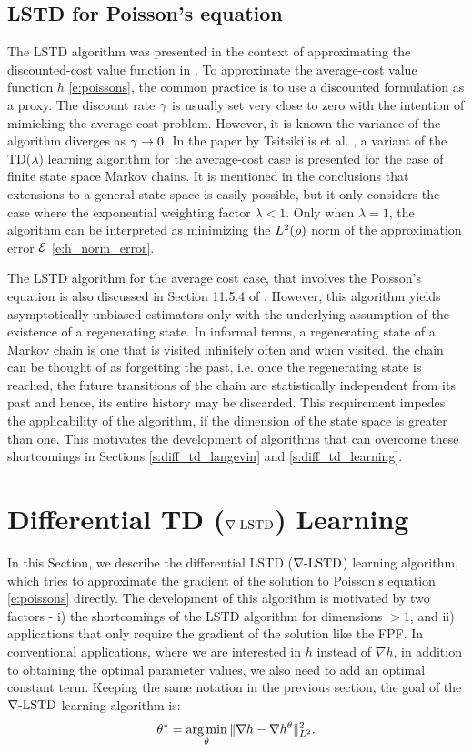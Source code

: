 \subsection{LSTD for Poisson's equation}
\label{s:lstd_avg_cost}
The LSTD algorithm was presented in the context of approximating the discounted-cost value function in . To approximate the average-cost value function $h$ \eqref{e:poissons}, the common practice is to use a discounted formulation as a proxy. The discount rate $\gamma$ is usually set very close to zero with the intention of mimicking the average cost problem. However, it is known the variance of the algorithm diverges as $\gamma \to 0$.  In the paper by Tsitsikilis et al. \cite{tsivan99b}, a variant of the TD($\lambda$) learning algorithm for the average-cost case is presented for the case of finite state space Markov chains. It is mentioned in the conclusions that extensions to a general state space is easily possible, but it only considers the case where the exponential weighting factor $\lambda <1$. Only when $\lambda =1$, the algorithm can be interpreted as minimizing the $L^2(\rho)$ norm of the approximation error $\mathcal{E}$ \eqref{e:h_norm_error}. 

The LSTD algorithm for the average cost case, that involves the Poisson's equation is also discussed in Section 11.5.4 of \cite{ctcn}. However, this algorithm yields asymptotically unbiased estimators only with the underlying assumption of the existence of a regenerating state. In informal terms, a regenerating state of a Markov chain is one that is visited infinitely often and when visited, the chain can be thought of as forgetting the past, i.e. once the regenerating state is reached, the future transitions of the chain are statistically independent from its past and hence, its entire history may be discarded. This requirement impedes the applicability of the algorithm, if the dimension of the state space is greater than one. This motivates the development of algorithms that can overcome these shortcomings in Sections \ref{s:diff_td_langevin} and \ref{s:diff_td_learning}.  

\section{Differential TD ($\nabla\text{-LSTD}$) Learning}
In this Section, we describe the differential LSTD ($\nabla\text{-LSTD}$) learning algorithm, which tries to approximate the gradient of the solution to Poisson's equation \eqref{e:poissons} directly. The development of this algorithm is motivated by two factors - i) the shortcomings of the LSTD algorithm for dimensions $>1$, and ii) applications that only require the gradient of the solution like the FPF. In conventional applications, where we are interested in $h$ instead of $\nabla h$, in addition to obtaining the optimal parameter values, we also need to add an optimal constant term. Keeping the same notation in the previous section, the goal of the $\nabla\text{-LSTD}$ learning algorithm is:
\begin{equation}
\param^* = \argmin_\param \| \grad h -\grad h^\param\|^2_{L^2}.
\label{e:gradTD_norm_error}
\end{equation}

